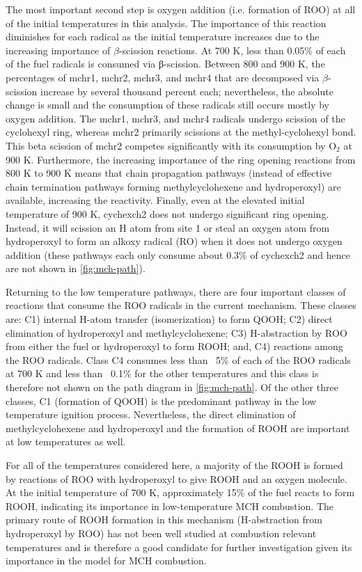 \documentclass[12pt, letterpaper]{article}
\begin{document}
The most important second step is oxygen addition (i.e. formation of ROO) at 
all of the initial temperatures in this analysis. The importance of this 
reaction diminishes for each radical as the initial temperature increases due 
to the increasing importance of $\beta$-scission reactions. At 700 K, less than 
0.05\% of each of the fuel radicals is consumed via β-scission. Between 800 and 
900 K, the percentages of mchr1, mchr2, mchr3, and mchr4 that are decomposed 
via $\beta$-scission increase by several thousand percent each; nevertheless, 
the absolute change is small and the consumption of these radicals still occurs 
mostly by oxygen addition. The mchr1, mchr3, and mchr4 radicals undergo 
scission of the cyclohexyl ring, whereas mchr2 primarily scissions at the 
methyl-cyclohexyl bond. This beta scission of mchr2 competes significantly with 
its consumption by O$_2$ at 900 K. Furthermore, the increasing importance of the 
ring opening reactions from 800 K to 900 K means that chain propagation pathways 
(instead of effective chain termination pathways forming methylcyclohexene and 
hydroperoxyl) are available, increasing the reactivity. Finally, even at the 
elevated initial temperature of 900 K, cychexch2 does not undergo significant 
ring opening. Instead, it will scission an H atom from site 1 or steal an oxygen 
atom from hydroperoxyl to form an alkoxy radical (RO) when it does not undergo 
oxygen addition (these pathways each only consume about 0.3\% of cychexch2 and 
hence are not shown in \autoref{fig:mch-path}).

Returning to the low temperature pathways, there are four important classes of 
reactions that consume the ROO radicals in the current mechanism. These classes 
are: C1) internal H-atom transfer (isomerization) to form QOOH; C2) direct 
elimination of hydroperoxyl and methylcyclohexene; C3) H-abstraction by ROO 
from either the fuel or hydroperoxyl to form ROOH; and, C4) reactions among the 
ROO radicals. Class C4 consumes less than ~5\% of each of the ROO radicals at 
700 K and less than ~0.1\% for the other temperatures and this class is 
therefore not shown on the path diagram in \autoref{fig:mch-path}. Of the other 
three classes, C1 (formation of QOOH) is the predominant pathway in the low 
temperature ignition process. Nevertheless, the direct elimination of 
methylcyclohexene and hydroperoxyl and the formation of ROOH are important at 
low temperatures as well.

For all of the temperatures considered here, a majority of the ROOH is formed 
by reactions of ROO with hydroperoxyl to give ROOH and an oxygen molecule. At 
the initial temperature of 700 K, approximately 15\% of the fuel reacts to form 
ROOH, indicating its importance in low-temperature MCH combustion. The primary 
route of ROOH formation in this mechanism (H-abstraction from hydroperoxyl by 
ROO) has not been well studied at combustion relevant temperatures 
\cite{Zador2011} and is therefore a good candidate for further investigation 
given its importance in the model for MCH combustion.
\end{document}
